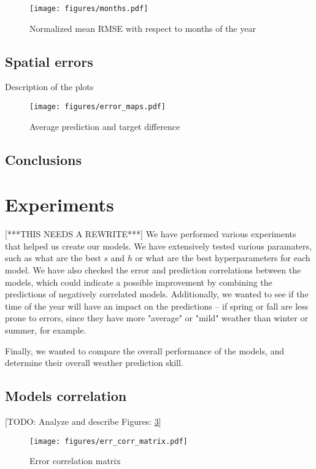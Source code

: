 \begin{figure}[!ht]
    \centering
    \texttt{[image: figures/months.pdf]}
    \caption{Normalized mean RMSE with respect to months of the year}
    \label{fig:monthly-error-plot}
\end{figure}

\FloatBarrier

\subsection{Spatial errors}
Description of the plots
\begin{figure}
    \centering
    \texttt{[image: figures/error\_maps.pdf]}
    \caption{Average prediction and target difference}
    \label{fig:error-maps}
\end{figure}

\FloatBarrier

\subsection{Conclusions}


\section{Experiments}\label{chap:exp}
[***THIS NEEDS A REWRITE***]
We have performed various experiments that helped us create our models. We have extensively tested various paramaters, such as what are the best $s$ and $h$ or what are the best hyperparameters for each model. We have also checked the error and prediction correlations between the models, which could indicate a possible improvement by combining the predictions of negatively correlated models. Additionally, we wanted to see if the time of the year will have an impact on the predictions -- if spring or fall are less prone to errors, since they have more "average" or "mild" weather than winter or summer, for example.

Finally, we wanted to compare the overall performance of the models, and determine their overall weather prediction skill.

\subsection{Models correlation}
[TODO: Analyze and describe Figures: \ref{fig:err-cor}]

\begin{figure}[!ht]
    \centering
    \texttt{[image: figures/err\_corr\_matrix.pdf]}
    \caption{Error correlation matrix}
    \label{fig:err-cor}
\end{figure}

